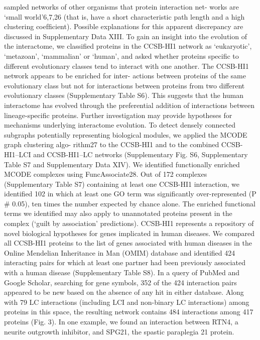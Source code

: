 sampled networks of other organisms that protein interaction net-
works are ‘small world’6,7,26 (that is, have a short characteristic path
length and a high clustering coefﬁcient). Possible explanations for
this apparent discrepancy are discussed in Supplementary Data XIII.
To gain an insight into the evolution of the interactome, we
classiﬁed proteins in the CCSB-HI1 network as ‘eukaryotic’,
‘metazoan’, ‘mammalian’ or ‘human’, and asked whether proteins
speciﬁc to different evolutionary classes tend to interact with one
another. The CCSB-HI1 network appears to be enriched for inter-
actions between proteins of the same evolutionary class but not for
interactions between proteins from two different evolutionary classes
(Supplementary Table S6). This suggests that the human interactome
has evolved through the preferential addition of interactions
between lineage-speciﬁc proteins. Further investigation may provide
hypotheses for mechanisms underlying interactome evolution.
To detect densely connected subgraphs potentially representing
biological modules, we applied the MCODE graph clustering algo-
rithm27 to the CCSB-HI1 and to the combined CCSB-HI1–LCI and
CCSB-HI1–LC networks (Supplementary Fig. S6, Supplementary
Table S7 and Supplementary Data XIV). We identiﬁed functionally
enriched MCODE complexes using FuncAssociate28. Out of 172
complexes (Supplementary Table S7) containing at least one
CCSB-HI1 interaction, we identiﬁed 102 in which at least one GO
term was signiﬁcantly over-represented (P \# 0.05), ten times the
number expected by chance alone. The enriched functional terms we
identiﬁed may also apply to unannotated proteins present in the
complex (‘guilt by association’ predictions).
CCSB-HI1 represents a repository of novel biological hypotheses
for genes implicated in human diseases. We compared all CCSB-HI1
proteins to the list of genes associated with human diseases in
the Online Mendelian Inheritance in Man (OMIM) database and
identiﬁed 424 interacting pairs for which at least one partner had
been previously associated with a human disease (Supplementary
Table S8). In a query of PubMed and Google Scholar, searching for
gene symbols, 352 of the 424 interaction pairs appeared to be new
based on the absence of any hit in either database. Along with 79 LC
interactions (including LCI and non-binary LC interactions) among
proteins in this space, the resulting network contains 484 interactions
among 417 proteins (Fig. 3).
In one example, we found an interaction between RTN4, a neurite
outgrowth inhibitor, and SPG21, the spastic paraplegia 21 protein.
